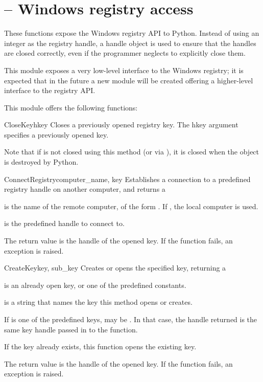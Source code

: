 \section{ --
         Windows registry access}



These functions expose the Windows registry API to Python.  Instead of
using an integer as the registry handle, a handle object is used to
ensure that the handles are closed correctly, even if the programmer
neglects to explicitly close them.

This module exposes a very low-level interface to the Windows
registry; it is expected that in the future a new  
module will be created offering a higher-level interface to the
registry API.

This module offers the following functions:


\begin{funcdesc}{CloseKey}{hkey}
 Closes a previously opened registry key.
 The hkey argument specifies a previously opened key.

 Note that if  is not closed using this method (or via
 ), it is closed when the  object
 is destroyed by Python.
\end{funcdesc}


\begin{funcdesc}{ConnectRegistry}{computer_name, key}
  Establishes a connection to a predefined registry handle on 
  another computer, and returns a 

  is the name of the remote computer, of the 
 form .  If , the local computer
 is used.
 
  is the predefined handle to connect to.

 The return value is the handle of the opened key.
 If the function fails, an  exception is 
 raised.
\end{funcdesc}


\begin{funcdesc}{CreateKey}{key, sub_key}
 Creates or opens the specified key, returning a 
 
  is an already open key, or one of the predefined 
  constants.
 
  is a string that names the key this method opens 
 or creates.
 
 If  is one of the predefined keys,  may 
 be . In that case, the handle returned is the same key handle 
 passed in to the function.

 If the key already exists, this function opens the existing key.

 The return value is the handle of the opened key.
 If the function fails, an  exception is 
 raised.
\end{funcdesc}

